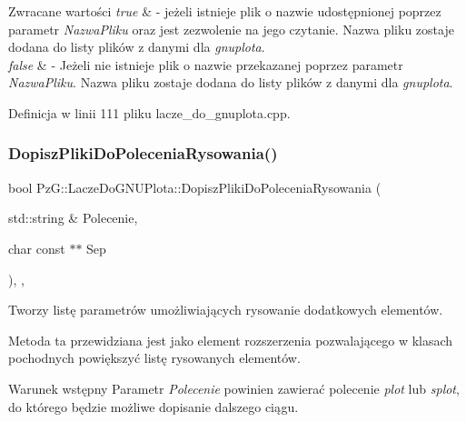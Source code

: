 \begin{DoxyRetVals}{Zwracane wartości}
{\em true} & -\/ jeżeli istnieje plik o nazwie udostępnionej poprzez parametr {\itshape Nazwa\+Pliku} oraz jest zezwolenie na jego czytanie. Nazwa pliku zostaje dodana do listy plików z danymi dla {\itshape gnuplota}. \\
\hline
{\em false} & -\/ Jeżeli nie istnieje plik o nazwie przekazanej poprzez parametr {\itshape Nazwa\+Pliku}. Nazwa pliku zostaje dodana do listy plików z danymi dla {\itshape gnuplota}. \\
\hline
\end{DoxyRetVals}


Definicja w linii 111 pliku lacze\+\_\+do\+\_\+gnuplota.\+cpp.

\mbox{\label{class_pz_g_1_1_lacze_do_g_n_u_plota_a25585ec3f1bd3b6bf42f374c38b8d237}} 
\subsubsection{\texorpdfstring{Dopisz\+Pliki\+Do\+Polecenia\+Rysowania()}{DopiszPlikiDoPoleceniaRysowania()}}
{\footnotesize\ttfamily bool Pz\+G\+::\+Lacze\+Do\+G\+N\+U\+Plota\+::\+Dopisz\+Pliki\+Do\+Polecenia\+Rysowania (\begin{DoxyParamCaption}\item[{std\+::string \&}]{Polecenie,  }\item[{char const $\ast$$\ast$}]{Sep }\end{DoxyParamCaption})\hspace{0.3cm}{\ttfamily [inline]}, {\ttfamily [protected]}, {\ttfamily [virtual]}}



Tworzy listę parametrów umożliwiających rysowanie dodatkowych elementów. 

Metoda ta przewidziana jest jako element rozszerzenia pozwalającego w klasach pochodnych powiększyć listę rysowanych elementów. \begin{DoxyPrecond}{Warunek wstępny}
Parametr {\itshape Polecenie} powinien zawierać polecenie {\itshape plot} lub {\itshape splot}, do którego będzie możliwe dopisanie dalszego ciągu. 
\end{DoxyPrecond}

